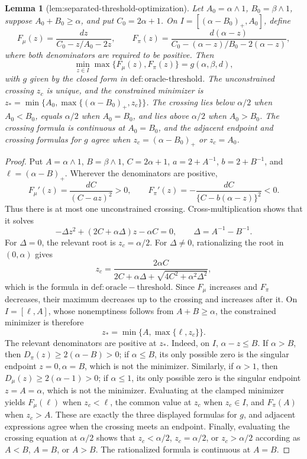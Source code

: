 \documentclass{article}
\newtheorem{lemma}{Lemma}
\begin{document}
\begin{lemma}[lem:separated-threshold-optimization]\label{lem:separated-threshold-optimization}
Let \(A_0=\alpha\wedge1\), \(B_0=\beta\wedge1\), suppose \(A_0+B_0\ge\alpha\), and put \(C_0=2\alpha+1\). On \(I=[(\alpha-B_0)_+,A_0]\), define
\[
F_\mu(z)=\frac{dz}{C_0-z/A_0-2z},
\qquad
F_\pi(z)=\frac{d(\alpha-z)}{C_0-(\alpha-z)/B_0-2(\alpha-z)},
\]
where both denominators are required to be positive. Then
\[
\min_{z\in I}\max\{F_\mu(z),F_\pi(z)\}=g(\alpha,\beta,d),
\]
with \(g\) given by the closed form in \(\mathrm{def:oracle\text{-}threshold}\). The unconstrained crossing \(z_c\) is unique, and the constrained minimizer is \(z_* = \min\{A_0,\max\{(\alpha-B_0)_+,z_c\}\}\). The crossing lies below \(\alpha/2\) when \(A_0<B_0\), equals \(\alpha/2\) when \(A_0=B_0\), and lies above \(\alpha/2\) when \(A_0>B_0\). The crossing formula is continuous at \(A_0=B_0\), and the adjacent endpoint and crossing formulas for \(g\) agree when \(z_c=(\alpha-B_0)_+\) or \(z_c=A_0\).
\end{lemma}
\begin{proof}
Put \(A=\alpha\wedge1\), \(B=\beta\wedge1\), \(C=2\alpha+1\), \(a=2+A^{-1}\), \(b=2+B^{-1}\), and \(\ell=(\alpha-B)_+\).  Wherever the denominators are positive,
\[
F_\mu'(z)=\frac{dC}{(C-az)^2}>0,
\qquad
F_\pi'(z)=-\frac{dC}{\{C-b(\alpha-z)\}^2}<0.
\]
Thus there is at most one unconstrained crossing.  Cross-multiplication shows that it solves
\[
-\Delta z^2+(2C+\alpha\Delta)z-\alpha C=0,
\qquad \Delta=A^{-1}-B^{-1}.
\]
For \(\Delta=0\), the relevant root is \(z_c=\alpha/2\).  For \(\Delta\ne0\), rationalizing the root in \((0,\alpha)\) gives
\[
z_c=\frac{2\alpha C}{2C+\alpha\Delta+\sqrt{4C^2+\alpha^2\Delta^2}},
\]
which is the formula in \(\mathrm{def:oracle-threshold}\).  Since \(F_\mu\) increases and \(F_\pi\) decreases, their maximum decreases up to the crossing and increases after it.  On \(I=[\ell,A]\), whose nonemptiness follows from \(A+B\ge\alpha\), the constrained minimizer is therefore
\[
z_* = \min\{A,\max\{\ell,z_c\}\}.
\]
The relevant denominators are positive at \(z_*\).  Indeed, on \(I\), \(\alpha-z\le B\).  If \(\alpha>B\), then \(D_\pi(z)\ge2(\alpha-B)>0\); if \(\alpha\le B\), its only possible zero is the singular endpoint \(z=0,\alpha=B\), which is not the minimizer.  Similarly, if \(\alpha>1\), then \(D_\mu(z)\ge2(\alpha-1)>0\); if \(\alpha\le1\), its only possible zero is the singular endpoint \(z=A=\alpha\), which is not the minimizer.  Evaluating at the clamped minimizer yields \(F_\mu(\ell)\) when \(z_c<\ell\), the common value at \(z_c\) when \(z_c\in I\), and \(F_\pi(A)\) when \(z_c>A\).  These are exactly the three displayed formulas for \(g\), and adjacent expressions agree when the crossing meets an endpoint.  Finally, evaluating the crossing equation at \(\alpha/2\) shows that \(z_c<\alpha/2\), \(z_c=\alpha/2\), or \(z_c>\alpha/2\) according as \(A<B\), \(A=B\), or \(A>B\).  The rationalized formula is continuous at \(A=B\).
\end{proof}
\end{document}
